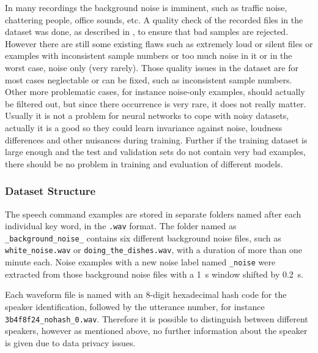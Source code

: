 In many recordings the background noise is imminent, such as traffic noise, chattering people, office sounds, etc.
A quality check of the recorded files in the dataset was done, as described in \cite{Warden2018}, to ensure that bad samples are rejected.
However there are still some existing flaws such as extremely loud or silent files or examples with inconsistent sample numbers or too much noise in it or in the worst case, noise only (very rarely).
Those quality issues in the dataset are for most cases neglectable or can be fixed, such as inconsistent sample numbers. 
Other more problematic cases, for instance noise-only examples, should actually be filtered out, but since there occurrence is very rare, it does not really matter.
Usually it is not a problem for neural networks to cope with noisy datasets, actually it is a good so they could learn invariance against noise, loudness differences and other nuisances during training.
Further if the training dataset is large enough and the test and validation sets do not contain very bad examples, there should be no problem in training and evaluation of different models.

\subsubsection{Dataset Structure}
The speech command examples are stored in separate folders named after each individual key word, in the \texttt{.wav} format.
The folder named as \texttt{\_background\_noise\_} contains six different background noise files, such as \texttt{white\_noise.wav} or \texttt{doing\_the\_dishes.wav}, with a duration of more than one minute each.
Noise examples with a new noise label named \texttt{\_noise} were extracted from those background noise files with a \SI{1}{\second} window shifted by \SI{0.2}{\second}.

Each waveform file is named with an 8-digit hexadecimal hash code for the speaker identification, followed by the utterance number, for instance \texttt{3b4f8f24\_nohash\_0.wav}.
Therefore it is possible to distinguish between different speakers, however as mentioned above, no further information about the speaker is given due to data privacy issues.


